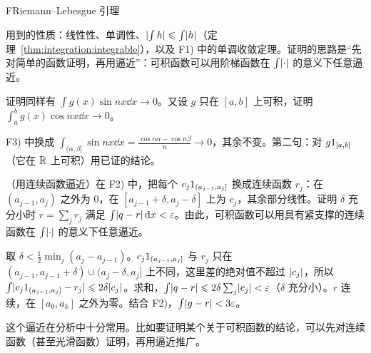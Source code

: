 \begin{probleme}{F}{Riemann--Lebesgue 引理}
\begin{questions}
\begin{solution}
用到的性质：线性性、单调性、$\lvert \int h\rvert\leqslant\int\lvert h\rvert$（定理~\ref{thm:integration:integrable}），以及 F1) 中的单调收敛定理。证明的思路是“先对简单的函数证明，再用逼近”：可积函数可以用阶梯函数在 $\int\lvert \cdot\rvert$ 的意义下任意逼近。
\end{solution}
\item 证明同样有 $\int g(x)\sin nx\dd x\to0$。又设 $g$ 只在 $[a,b]$ 上可积，证明 $\int_a^bg(x)\cos nx\dd x\to0$。
\begin{solution}
F3) 中换成 $\int_{(\alpha,\beta]}\sin nx\dd x=\frac{\cos n\alpha-\cos n\beta}n\to0$，其余不变。第二句：对 $g1_{[a,b]}$（它在 $\mathbb{R}$ 上可积）用已证的结论。
\end{solution}
\item （用连续函数逼近）在 F2) 中，把每个 $c_j1_{(a_{j-1},a_j]}$ 换成连续函数 $r_j$：在 $(a_{j-1},a_j)$ 之外为 $0$，在 $[a_{j-1}+\delta,a_j-\delta]$ 上为 $c_j$，其余部分线性。证明 $\delta$ 充分小时 $r=\sum_jr_j$ 满足 $\int\lvert q-r\rvert\,\mathrm{d} x<\varepsilon$。由此，可积函数可以用具有紧支撑的连续函数在 $\int\lvert \cdot\rvert$ 的意义下任意逼近。
\begin{solution}
取 $\delta<\frac12\min_j(a_j-a_{j-1})$。$c_j1_{(a_{j-1},a_j]}$ 与 $r_j$ 只在 $(a_{j-1},a_{j-1}+\delta)\cup(a_j-\delta,a_j]$ 上不同，这里差的绝对值不超过 $\lvert c_j\rvert$，所以 $\int\lvert c_j1_{(a_{j-1},a_j]}-r_j\rvert\leqslant2\delta\lvert c_j\rvert$。求和，$\int\lvert q-r\rvert\leqslant2\delta\sum_j\lvert c_j\rvert<\varepsilon$（$\delta$ 充分小）。$r$ 连续，在 $[a_0,a_k]$ 之外为零。结合 F2)，$\int\lvert g-r\rvert<3\varepsilon$。

这个逼近在分析中十分常用。比如要证明某个关于可积函数的结论，可以先对连续函数（甚至光滑函数）证明，再用逼近推广。
\end{solution}
\end{questions}
\end{probleme}
